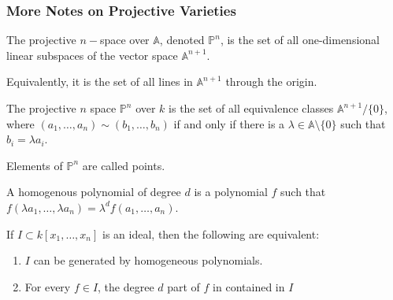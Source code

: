             \subsubsection{More Notes on Projective Varieties}
                \begin{definition}
                    The projective $n-$space over $\mathbb{A}$,
                    denoted $\mathbb{P}^{n}$, is the set of all
                    one-dimensional linear subspaces of the vector
                    space $\mathbb{A}^{n+1}$.
                \end{definition}
                \begin{remark}
                    Equivalently, it is the set of all lines
                    in $\mathbb{A}^{n+1}$ through the origin.
                \end{remark}
                \begin{definition}
                    The projective $n$ space $\mathbb{P}^{n}$ over $k$
                    is the set of all equivalence classes
                    $\mathbb{A}^{n+1}/\{0\}$, where
                    $(a_{1},\hdots,a_{n})\sim(b_{1},\hdots,b_{n})$
                    if and only if there is a
                    $\lambda\in\mathbb{A}\setminus\{0\}$
                    such that $b_{i}=\lambda{a_{i}}$.
                \end{definition}
                \begin{remark}
                    Elements of $\mathbb{P}^{n}$ are called points.
                \end{remark}
                \begin{definition}
                    A homogenous polynomial of degree $d$
                    is a polynomial $f$ such that
                    $f(\lambda a_1,\hdots,\lambda a_n)%
                     =\lambda^d f(a_1,\hdots, a_n)$.
                \end{definition}
                \begin{theorem}
                    If $I\subset k[x_1,\hdots ,x_n]$ is an ideal,
                    then the following are equivalent:
                    \begin{enumerate}
                        \item $I$ can be generated by
                              homogeneous polynomials.
                        \item For every $f\in I$, the degree
                              $d$ part of $f$ in contained in $I$
                    \end{enumerate}
                \end{theorem}
